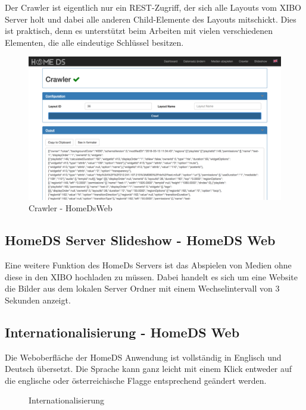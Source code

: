 Der Crawler ist eigentlich nur ein REST-Zugriff, der sich alle Layouts vom XIBO Server holt und dabei alle anderen Child-Elemente des Layouts mitschickt. Dies ist praktisch, denn es unterstützt beim Arbeiten mit vielen verschiedenen Elementen, die alle eindeutige Schlüssel besitzen.

\begin{figure}[H]
\centering
\includegraphics[width=1\textwidth]{images/08_HomeDsWeb/Crawler.png}
\caption{Crawler - HomeDsWeb}
\label{img:crawler}
\end{figure}

\subsection{HomeDS Server Slideshow - HomeDS Web}\label{sec:homedsslideshow}
Eine weitere Funktion des HomeDs Servers ist das Abspielen von Medien ohne diese in den XIBO hochladen zu müssen. Dabei handelt es sich um eine Website die Bilder aus dem lokalen Server Ordner mit einem Wechselintervall von 3 Sekunden anzeigt. 

\subsection{Internationalisierung - HomeDS Web}\label{sec:i18n}
Die Weboberfläche der HomeDS Anwendung ist vollständig in Englisch und Deutsch übersetzt. Die Sprache kann ganz leicht mit einem Klick entweder auf die englische oder österreichische Flagge entsprechend geändert werden.

\begin{figure}[H]
    \centering
    \qquad
    \caption{Internationalisierung}
    \label{img:flags}
\end{figure}

